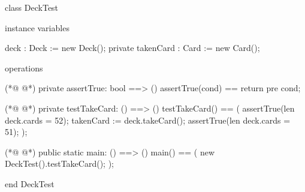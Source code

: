 \begin{vdmpp}[breaklines=true]
class DeckTest

 instance variables
 
   deck : Deck := new Deck();
   private takenCard : Card := new Card();
   
   
 operations
 
(*@
\label{assertTrue:11}
@*)
    private assertTrue: bool ==> ()
     assertTrue(cond) == return
    pre cond;
            
(*@
\label{testTakeCard:15}
@*)
    private testTakeCard: () ==> ()
    testTakeCard() ==
    (
     assertTrue(len deck.cards = 52);
     takenCard := deck.takeCard();
      assertTrue(len deck.cards = 51);
    );
    
   
(*@
\label{main:24}
@*)
    public static main: () ==> ()
    main() ==
    (
       new DeckTest().testTakeCard();     
    );
    
end DeckTest
\end{vdmpp}
